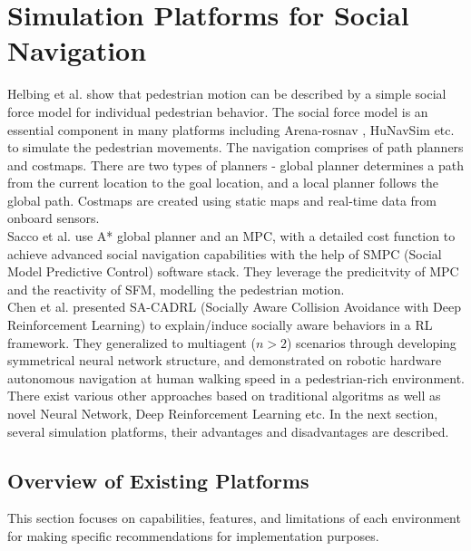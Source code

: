 \section{Simulation Platforms for Social Navigation}
Helbing et al. \cite{Helbing_1995} show that pedestrian motion can be described by a simple 
social force model for individual pedestrian behavior. The social force model is an essential 
component in many platforms including Arena-rosnav \cite{arenabench}, HuNavSim \cite{hunavsimros2human}
etc. to simulate the pedestrian movements. 
The navigation comprises of path planners and costmaps. There are two types of planners - global 
planner determines a path from the current location to the goal location, and a local planner 
follows the global path. Costmaps are created using static maps and real-time data from onboard
sensors. \\

Sacco et al. \cite{MPCwithsfm} use A* global planner and an MPC, with a detailed cost 
function to achieve advanced social navigation capabilities with the help of SMPC (Social 
Model Predictive Control) software stack. They leverage the predicitvity of MPC and the 
reactivity of SFM, modelling the pedestrian motion.\\

Chen et al. \cite{chen2018sociallyawaremotionplanning} presented SA-CADRL (Socially Aware Collision 
Avoidance with Deep Reinforcement Learning) to explain/induce socially aware behaviors in a RL 
framework. They generalized to multiagent ($n > 2$) scenarios through developing symmetrical neural
network structure, and demonstrated on robotic hardware autonomous navigation at human walking 
speed in a pedestrian-rich environment. \\

There exist various other approaches based on traditional algoritms as well as novel 
Neural Network, Deep Reinforcement Learning etc. In the next section, several simulation platforms,
their advantages and disadvantages are described. 


\subsection{Overview of Existing Platforms}
This section focuses on capabilities, features, and limitations of each environment for 
making specific recommendations for implementation purposes. 

